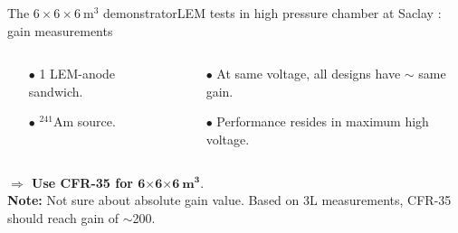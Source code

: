 \documentclass[10pt]{beamer}
\begin{document}
\begin{frame}{The \texorpdfstring{$6 \times 6 \times \SI{6}{\meter\cubed}$}{666} demonstrator}{LEM tests in high pressure chamber at Saclay : gain measurements}
\begin{scriptsize}
\begin{columns}
\begin{column}{0.58\textwidth}
    			\end{column}
    		\end{columns}\vfill
    		\begin{columns}
    			\begin{column}{0.38\textwidth}
    				\begin{itemize}
    					\item[$\bullet$] 1 LEM-anode sandwich.
    					\item[$\bullet$] $^{241}$Am source.
    				\end{itemize}
    			\end{column}\hfill
    			\begin{column}{0.58\textwidth}
    				\begin{itemize}
    					\item[$\bullet$] At same voltage, all designs have $\sim$ same gain.
    					\item[$\bullet$] Performance resides in maximum high voltage.
    				\end{itemize}
    			\end{column}
    		\end{columns}
    		\vfill
    		\textbf{$\Rightarrow$ Use CFR-35 for $\mathbf{6 \boldsymbol{\times} 6 \boldsymbol{\times} \SI[detect-weight]{6}{\meter\cubed}}$}.\\
    		\textbf{Note:} Not sure about absolute gain value. Based on 3L measurements, CFR-35 should reach gain of $\sim$200.
    	\end{scriptsize}
    \end{frame}
    
\end{document}
